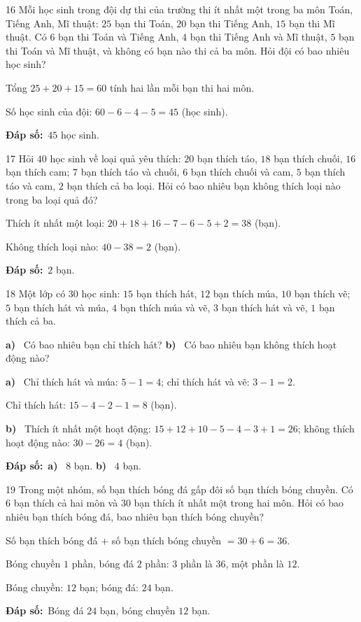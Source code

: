 \documentclass[11pt]{article}
\newif\ifsol \solfalse
\providecommand{\AnsWord}{Đáp số}
\newcommand{\dapso}[1]{\par\textbf{\AnsWord:}\ #1}
\newcommand{\probsol}[1]{%
  \begin{lrbox}{\solmeasure}\begin{minipage}{\dimexpr\linewidth-24pt\relax}#1\end{minipage}\end{lrbox}%
  \ifsol
    \begin{solbox}#1\end{solbox}%
  \else
    \setlength{\solht}{\dimexpr\ht\solmeasure+\dp\solmeasure+0.85cm\relax}%
    \ifdim\solht<1.35cm\setlength{\solht}{1.35cm}\fi
    \begin{tcolorbox}[colback=white,colframe=Line,boxrule=0.8pt,arc=5pt,
      left=8pt,right=8pt,top=4pt,bottom=4pt,height=\solht]{\footnotesize\color{Slate}\itshape\WorkWord}\end{tcolorbox}%
  \fi}
\newcommand{\pa}[1]{\textbf{#1)}\ }
\newcommand{\gap}{\vspace{0.3cm}}
\def\WorkWord{Bài làm:}
\def\AnsWord{Đáp số}
\begin{document}
\gap
\begin{probbox}{16}{\relax}
Mỗi học sinh trong đội dự thi của trường thi ít nhất một trong ba môn Toán, Tiếng Anh, Mĩ thuật: $25$ bạn thi Toán, $20$ bạn thi Tiếng Anh, $15$ bạn thi Mĩ thuật. Có $6$ bạn thi Toán và Tiếng Anh, $4$ bạn thi Tiếng Anh và Mĩ thuật, $5$ bạn thi Toán và Mĩ thuật, và không có bạn nào thi cả ba môn. Hỏi đội có bao nhiêu học sinh?
\end{probbox}
\probsol{
Tổng $25+20+15=60$ tính hai lần mỗi bạn thi hai môn.\par
Số học sinh của đội: $60-6-4-5=45$ (học sinh).
\dapso{$45$ học sinh.}}
\gap
\begin{probbox}{17}{\relax}
Hỏi $40$ học sinh về loại quả yêu thích: $20$ bạn thích táo, $18$ bạn thích chuối, $16$ bạn thích cam; $7$ bạn thích táo và chuối, $6$ bạn thích chuối và cam, $5$ bạn thích táo và cam, $2$ bạn thích cả ba loại. Hỏi có bao nhiêu bạn không thích loại nào trong ba loại quả đó?
\end{probbox}
\probsol{
Thích ít nhất một loại: $20+18+16-7-6-5+2=38$ (bạn).\par Không thích loại nào: $40-38=2$ (bạn).
\dapso{$2$ bạn.}}
\gap
\begin{probbox}{18}{\relax}
Một lớp có $30$ học sinh: $15$ bạn thích hát, $12$ bạn thích múa, $10$ bạn thích vẽ; $5$ bạn thích hát và múa, $4$ bạn thích múa và vẽ, $3$ bạn thích hát và vẽ, $1$ bạn thích cả ba.\par
\pa{a} Có bao nhiêu bạn chỉ thích hát? \quad \pa{b} Có bao nhiêu bạn không thích hoạt động nào?
\end{probbox}
\probsol{
\pa{a} Chỉ thích hát và múa: $5-1=4$; chỉ thích hát và vẽ: $3-1=2$.\par Chỉ thích hát: $15-4-2-1=8$ (bạn).\par
\pa{b} Thích ít nhất một hoạt động: $15+12+10-5-4-3+1=26$; không thích hoạt động nào: $30-26=4$ (bạn).
\dapso{\pa{a} $8$ bạn. \pa{b} $4$ bạn.}}
\gap
\begin{probbox}{19}{\relax}
Trong một nhóm, số bạn thích bóng đá gấp đôi số bạn thích bóng chuyền. Có $6$ bạn thích cả hai môn và $30$ bạn thích ít nhất một trong hai môn. Hỏi có bao nhiêu bạn thích bóng đá, bao nhiêu bạn thích bóng chuyền?
\end{probbox}
\probsol{
Số bạn thích bóng đá $+$ số bạn thích bóng chuyền $=30+6=36$.\par Bóng chuyền $1$ phần, bóng đá $2$ phần: $3$ phần là $36$, một phần là $12$.\par
Bóng chuyền: $12$ bạn; bóng đá: $24$ bạn.
\dapso{Bóng đá $24$ bạn, bóng chuyền $12$ bạn.}}
\end{document}
